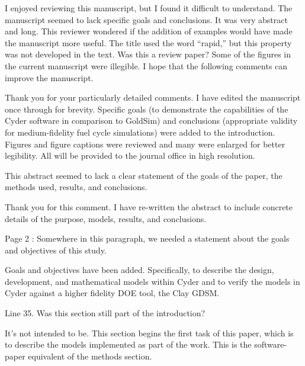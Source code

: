 \documentclass[answers,12pt]{exam}
\begin{document}
\begin{questions}
\question I enjoyed reviewing this manuscript, but I found it difficult to understand.
The manuscript seemed to lack specific goals and conclusions. It was very
abstract and long.  This reviewer wondered if the addition of examples would
have made the manuscript more useful. The title used the word ``rapid,'' but this
property was not developed in the text. Was this a review paper? Some of the
figures in the current manuscript were illegible. I hope that the following
comments can improve the manuscript.
\begin{solution}
Thank you for your particularly detailed comments. I have edited the manuscript
        once through for brevity. 
        Specific goals (to demonstrate the capabilities of the Cyder software in 
        comparison to GoldSim) and conclusions (appropriate validity for 
        medium-fidelity fuel cycle simulations) were added to the introduction. 
        Figures and figure captions were reviewed and many were enlarged for 
        better legibility. All will be provided to the journal office in high 
        resolution.
\end{solution}

\question This abstract seemed to lack a clear statement of the goals of the paper, the methods used, results, and conclusions.
\begin{solution}
Thank you for this comment. I have re-written the abstract to include concrete 
details of the purpose, models, results, and conclusions. 
\end{solution}

\question Page 2 : Somewhere in this paragraph, we needed a statement about the goals and objectives of this study.
\begin{solution}
Goals and objectives have been added. Specifically, to describe the design, 
        development, and mathematical models within Cyder and to verify the 
        models in Cyder against a higher fidelity DOE tool, the Clay GDSM.
\end{solution}


\question Line 35. Was this section still part of the introduction?

\begin{solution}
It's not intended to be. This section begins the first task of this paper, which is to describe the 
models implemented as part of the work. This is the software-paper equivalent 
        of the methods section.
\end{solution}


\end{questions}
\end{document}
